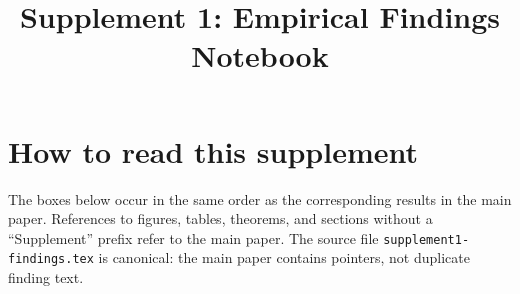 \documentclass[man,12pt,floatsintext,donotrepeattitle]{apa7}
\title{Supplement 1: Empirical Findings Notebook}
\begin{document}
\maketitle

\section{How to read this supplement}

The boxes below occur in the same order as the corresponding results in the
main paper. References to figures, tables, theorems, and sections without a
``Supplement'' prefix refer to the main paper. The source file
\texttt{supplement1-findings.tex} is canonical: the main paper contains pointers,
not duplicate finding text.



\printbibliography
\end{document}
